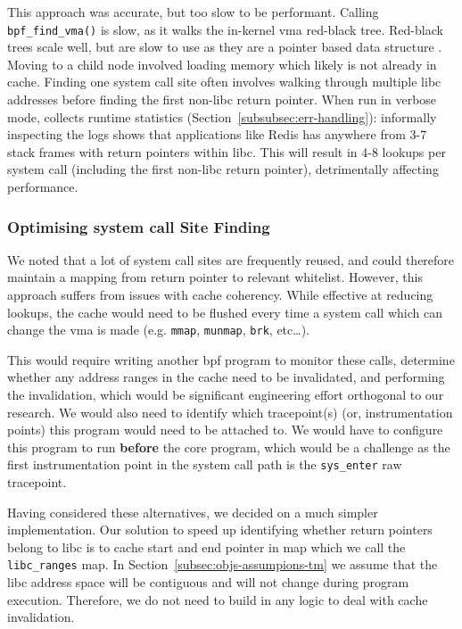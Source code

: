 This approach was accurate, but too slow to be performant. Calling \texttt{bpf\_find\_vma()} is
slow, as it walks the in-kernel \ac{vma} red-black tree. Red-black trees scale
well, but are slow to use as they are a pointer based data structure \cite{pointer-based-ds-slow}. Moving to
a child node involved loading memory which likely is not already in cache.
Finding one system call site often involves walking through multiple \ac{libc}
addresses before finding the first non-\ac{libc} return pointer. When run in
verbose mode, \af collects runtime statistics
(Section~\ref{subsubsec:err-handling}): informally inspecting the logs shows that
applications like Redis has anywhere from 3-7 stack frames with return pointers 
within \ac{libc}. This will result in 4-8 lookups per system call (including the
first non-\ac{libc} return pointer), detrimentally affecting performance.

\subsubsection{Optimising system call Site
Finding}\label{subsubsec:impl-find-site-opt}

We noted that a lot of system call sites are frequently reused, and could
therefore maintain a mapping from return pointer to relevant whitelist. However,
this approach suffers from issues with cache coherency. While effective at
reducing lookups, the cache would need to be flushed every time a system call which
can change the \ac{vma} is made (e.g. \texttt{mmap}, \texttt{munmap},
\texttt{brk}, etc\dots). 

This would require writing another \ac{bpf} program to
monitor these calls, determine whether any address ranges in the cache need to
be invalidated, and performing the invalidation, which would be significant
engineering effort orthogonal to our research. We would also need to identify
which tracepoint(s) (or, instrumentation points) this program would need to be
attached to. We would have to configure this program to run \textbf{before} the
\af core program, which would be a challenge as the first instrumentation point
in the system call path is the \texttt{sys\_enter} raw tracepoint.

Having considered these alternatives, we decided on a much simpler
implementation. Our solution to speed up identifying whether return pointers
belong to \ac{libc} is to cache  start and end pointer in 
map which we call the \texttt{libc\_ranges} map. In 
Section~\ref{subsec:objs-assumpions-tm} we assume that the  \ac{libc} address space 
will be contiguous and will not change during program execution. Therefore, we
do not need to build in any logic to deal with cache invalidation.

